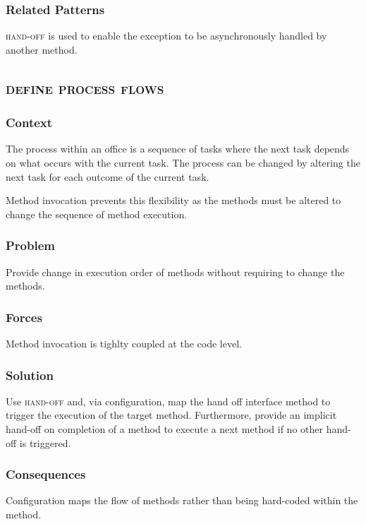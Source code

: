 \documentclass[prodmode]{style/acmlarge}
\begin{document}
\subsubsection*{Related Patterns} \textsc{hand-off} is used to enable the
exception to be asynchronously handled by another method.



\subsection{\textsc{\textbf{define process flows}}}

\subsubsection*{Context} The process within an office is a sequence of tasks
where the next task depends on what occurs with the current task.  The process
can be changed by altering the next task for each outcome of the current task.

Method invocation prevents this flexibility as the methods must be altered to
change the sequence of method execution.

\subsubsection*{Problem} Provide change in execution order of methods without
requiring to change the methods.

\subsubsection*{Forces} Method invocation is tighlty coupled at the code level.

\subsubsection*{Solution} Use \textsc{hand-off} and, via configuration, map the
hand off interface method to trigger the execution of the target method. 
Furthermore, provide an implicit hand-off on completion of a method to execute a
next method if no other hand-off is triggered.

\subsubsection*{Consequences} Configuration maps the flow of methods rather than
being hard-coded within the method.
\end{document}
